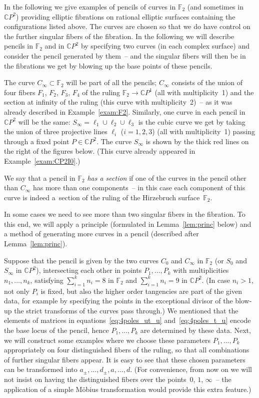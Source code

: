 \documentclass[10pt,a4paper]{amsart}
\newcommand{\CP}[1]{\mathbb{C}P^{#1}} %
\numberwithin{equation}{section}
\begin{document}
In the following we give examples of pencils of curves in ${\mathbb
 {F}}_2$ (and sometimes in $\CP{2}$) providing elliptic fibrations on rational
elliptic surfaces containing the configurations listed above.
The curves are chosen so that we do have control on the further
singular fibers of the fibration. In the following we will describe
pencils in ${\mathbb {F}}_2$ and in $\CP{2}$ by specifying two curves
(in each complex surface) and consider the pencil generated by them~-- and the singular fibers will then be in the fibrations we get by
blowing up {the base points of} these pencils.

The curve $C_{\infty}\subset
{\mathbb {F}}_2$ will be part of all the pencils; $C_{\infty}$
consists of the union of four fibers $F_1$, $F_2$, $F_3$, $F_4$ of the ruling
${\mathbb {F}}_2\to \CP{1}$ (all with multiplicity~1) and the section
at infinity of the ruling (this curve with multiplicity~2)~-- as it
was already described in Example~\ref{exam:F2}.
Similarly, one curve in each pencil in~$\CP{2}$ will be the same:
$S_{\infty}=\ell _1\cup \ell _2\cup \ell _3$ is the cubic curve we get
by taking the union of three projective lines $\ell _i$ ($i=1,2,3$)
(all with multiplicity~1) passing through a fixed point $P\in
\CP{2}$. The curve $S_{\infty}$ is shown by the thick red lines on the right of
the figures below. (This curve already appeared in Example~\ref{exam:CP2I0}.)

We say that a pencil in ${\mathbb {F}}_2$ \emph{has a section}
if one of the curves in the pencil other than $C_{\infty}$
has more than one components~-- in this case each component
of this curve is indeed a~section of the ruling of
the Hirzebruch surface~${\mathbb {F}}_2$.

In some cases we need to see more than two singular fibers in the
fibration. To this end, we will apply a principle (formulated in
Lemma~\ref{lem:princ} below) and a method of generating more curves in
a pencil (described after Lemma~\ref{lem:princ}).

Suppose that the pencil is given by the two curves $C_0$ and
$C_{\infty}$ in ${\mathbb {F}}_2$ (or $S_0$ and $S_{\infty}$ in
$\CP{2}$), intersecting each other in points $P_1, \ldots , P_k$ with
multiplicities $n_1, \ldots ,n_k$, satisfying $\sum_{i=1}^kn_i=8$ in
${\mathbb {F}}_2$ and $\sum_{i=1}^kn_i=9$ in $\CP{2}$. (In case
$n_i>1$, not only $P_i$ is fixed, but also the higher order tangencies
are part of the given data, for example by specifying the points in
the exceptional divisor of the blow-up the strict transforms of the
curves pass through.) We mentioned that the elements of matrices in
equations~\eqref{eq:4poles_ut_u} and~\eqref{eq:4poles_t_u} encode the
base locus of the pencil, hence $P_1, \ldots , P_k$ are determined by
these data. Next, we will construct some examples where we choose
these parameters $P_1, \ldots , P_k$ appropriately on four
distinguished fibers of the ruling, so that all combinations of
further singular fibers appear. It is easy to see that these chosen
parameters can be transformed into $a_{\pm}, \dots, d_{\pm}, a, \dots,
d$. (For convenience, from now on we will not insist on having the
distinguished fibers over the points~$0$, $1$, $\infty$~-- the application
of a simple M\"obius transformation would provide this extra feature.)
\end{document}
